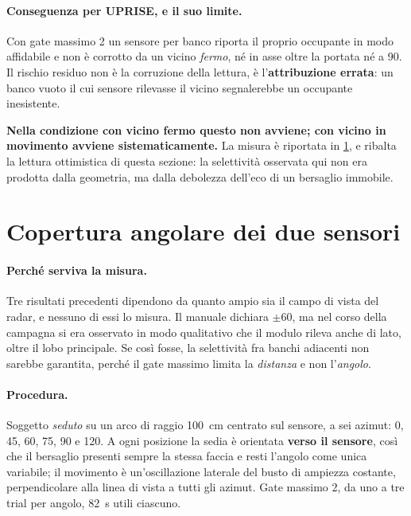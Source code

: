 \paragraph{Conseguenza per UPRISE, e il suo limite.} Con gate massimo 2 un sensore per
banco riporta il proprio occupante in modo affidabile e non è corrotto da un vicino
\emph{fermo}, né in asse oltre la portata né a 90\textdegree. Il rischio residuo non è
la corruzione della lettura, è l'\textbf{attribuzione errata}: un banco vuoto il cui
sensore rilevasse il vicino segnalerebbe un occupante inesistente.

\textbf{Nella condizione con vicino fermo questo non avviene; con vicino in movimento
avviene sistematicamente.} La misura è riportata in \cref{sec:angolare}, e ribalta la
lettura ottimistica di questa sezione: la selettività osservata qui non era prodotta
dalla geometria, ma dalla debolezza dell'eco di un bersaglio immobile.

\section{Copertura angolare dei due sensori}
\label{sec:angolare}

\paragraph{Perché serviva la misura.} Tre risultati precedenti dipendono da quanto
ampio sia il campo di vista del radar, e nessuno di essi lo misura. Il manuale dichiara
$\pm 60$\textdegree, ma nel corso della campagna si era osservato in modo qualitativo
che il modulo rileva anche di lato, oltre il lobo principale. Se così fosse, la
selettività fra banchi adiacenti non sarebbe garantita, perché il gate massimo limita
la \emph{distanza} e non l'\emph{angolo}.

\paragraph{Procedura.} Soggetto \emph{seduto} su un arco di raggio 100~cm centrato sul
sensore, a sei azimut: 0, 45, 60, 75, 90 e 120\textdegree. A ogni posizione la sedia è
orientata \textbf{verso il sensore}, così che il bersaglio presenti sempre la stessa
faccia e resti l'angolo come unica variabile; il movimento è un'oscillazione laterale
del busto di ampiezza costante, perpendicolare alla linea di vista a tutti gli azimut.
Gate massimo 2, da uno a tre trial per angolo, 82~s utili ciascuno.

